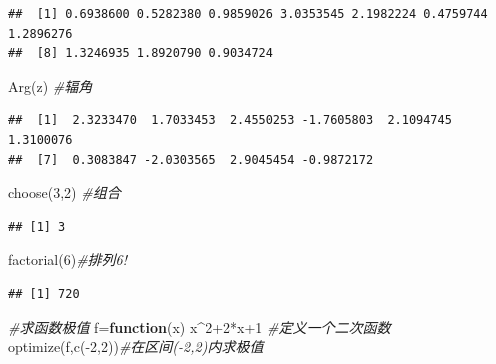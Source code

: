 \documentclass[
]{book}
\newenvironment{Shaded}{\begin{snugshade}}{\end{snugshade}}
\newcommand{\CommentTok}[1]{\textcolor[rgb]{0.56,0.35,0.01}{\textit{#1}}}
\newcommand{\ControlFlowTok}[1]{\textcolor[rgb]{0.13,0.29,0.53}{\textbf{#1}}}
\newcommand{\DecValTok}[1]{\textcolor[rgb]{0.00,0.00,0.81}{#1}}
\newcommand{\FunctionTok}[1]{\textcolor[rgb]{0.00,0.00,0.00}{#1}}
\newcommand{\NormalTok}[1]{#1}
\newcommand{\OtherTok}[1]{\textcolor[rgb]{0.56,0.35,0.01}{#1}}
\newcommand{\SpecialCharTok}[1]{\textcolor[rgb]{0.00,0.00,0.00}{#1}}
\begin{document}
\begin{verbatim}
##  [1] 0.6938600 0.5282380 0.9859026 3.0353545 2.1982224 0.4759744 1.2896276
##  [8] 1.3246935 1.8920790 0.9034724
\end{verbatim}

\begin{Shaded}
\begin{Highlighting}[]
\FunctionTok{Arg}\NormalTok{(z) }\CommentTok{\#辐角}
\end{Highlighting}
\end{Shaded}

\begin{verbatim}
##  [1]  2.3233470  1.7033453  2.4550253 -1.7605803  2.1094745  1.3100076
##  [7]  0.3083847 -2.0303565  2.9045454 -0.9872172
\end{verbatim}

\begin{Shaded}
\begin{Highlighting}[]
\FunctionTok{choose}\NormalTok{(}\DecValTok{3}\NormalTok{,}\DecValTok{2}\NormalTok{) }\CommentTok{\#组合}
\end{Highlighting}
\end{Shaded}

\begin{verbatim}
## [1] 3
\end{verbatim}

\begin{Shaded}
\begin{Highlighting}[]
\FunctionTok{factorial}\NormalTok{(}\DecValTok{6}\NormalTok{)}\CommentTok{\#排列6!}
\end{Highlighting}
\end{Shaded}

\begin{verbatim}
## [1] 720
\end{verbatim}

\begin{Shaded}
\begin{Highlighting}[]
\CommentTok{\#求函数极值}
\NormalTok{f}\OtherTok{=}\ControlFlowTok{function}\NormalTok{(x) x}\SpecialCharTok{\^{}}\DecValTok{2}\SpecialCharTok{+}\DecValTok{2}\SpecialCharTok{*}\NormalTok{x}\SpecialCharTok{+}\DecValTok{1} \CommentTok{\#定义一个二次函数}
\FunctionTok{optimize}\NormalTok{(f,}\FunctionTok{c}\NormalTok{(}\SpecialCharTok{{-}}\DecValTok{2}\NormalTok{,}\DecValTok{2}\NormalTok{))}\CommentTok{\#在区间({-}2,2)内求极值}
\end{Highlighting}
\end{Shaded}
\end{document}
